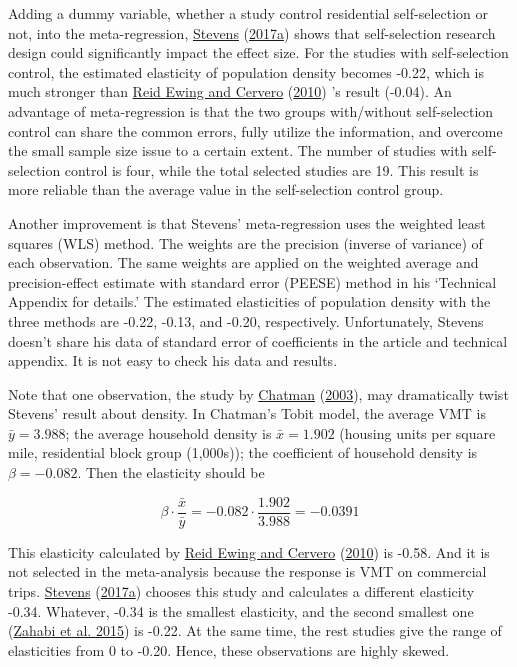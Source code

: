 \documentclass[
  12pt,
]{article}
\begin{document}
Adding a dummy variable, whether a study control residential self-selection or not, into the meta-regression, \protect\hyperlink{ref-stevensDoesCompactDevelopment2017}{Stevens} (\protect\hyperlink{ref-stevensDoesCompactDevelopment2017}{2017a}) shows that self-selection research design could significantly impact the effect size. For the studies with self-selection control, the estimated elasticity of population density becomes -0.22, which is much stronger than \protect\hyperlink{ref-ewingTravelBuiltEnvironment2010}{Reid Ewing and Cervero} (\protect\hyperlink{ref-ewingTravelBuiltEnvironment2010}{2010}) 's result (-0.04). An advantage of meta-regression is that the two groups with/without self-selection control can share the common errors, fully utilize the information, and overcome the small sample size issue to a certain extent. The number of studies with self-selection control is four, while the total selected studies are 19. This result is more reliable than the average value in the self-selection control group.

Another improvement is that Stevens' meta-regression uses the weighted least squares (WLS) method. The weights are the precision (inverse of variance) of each observation. The same weights are applied on the weighted average and precision-effect estimate with standard error (PEESE) method in his `Technical Appendix for details.' The estimated elasticities of population density with the three methods are -0.22, -0.13, and -0.20, respectively. Unfortunately, Stevens doesn't share his data of standard error of coefficients in the article and technical appendix. It is not easy to check his data and results.

Note that one observation, the study by \protect\hyperlink{ref-chatmanHowDensityMixed2003}{Chatman} (\protect\hyperlink{ref-chatmanHowDensityMixed2003}{2003}), may dramatically twist Stevens' result about density. In Chatman's Tobit model, the average VMT is \(\bar y= 3.988\); the average household density is \(\bar x= 1.902\) (housing units per square mile, residential block group (1,000s)); the coefficient of household density is \(\beta=-0.082\). Then the elasticity should be

\[
\beta\cdot\frac{\bar x}{\bar y}=-0.082\cdot\frac{1.902}{3.988}=-0.0391
\]

This elasticity calculated by \protect\hyperlink{ref-ewingTravelBuiltEnvironment2010}{Reid Ewing and Cervero} (\protect\hyperlink{ref-ewingTravelBuiltEnvironment2010}{2010}) is -0.58. And it is not selected in the meta-analysis because the response is VMT on commercial trips. \protect\hyperlink{ref-stevensDoesCompactDevelopment2017}{Stevens} (\protect\hyperlink{ref-stevensDoesCompactDevelopment2017}{2017a}) chooses this study and calculates a different elasticity -0.34. Whatever, -0.34 is the smallest elasticity, and the second smallest one (\protect\hyperlink{ref-zahabiSpatiotemporalAnalysisCar2015}{Zahabi et al. 2015}) is -0.22. At the same time, the rest studies give the range of elasticities from 0 to -0.20. Hence, these observations are highly skewed.
\end{document}
